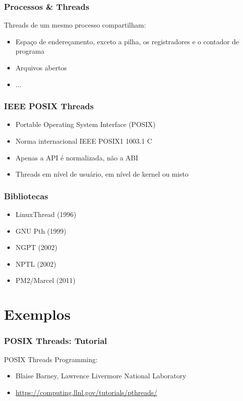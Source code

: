 \documentclass[10pt, compress]{beamer}
\begin{document}
\begin{frame}
    \frametitle{Processos \& Threads}
    \alert{Threads} de um mesmo processo \alert{compartilham}:

    \begin{itemize}
        \item \alert{Espaço de endereçamento}, exceto a pilha, os
            registradores e o contador de programa
        \item Arquivos abertos
        \item $\dots$
    \end{itemize}
\end{frame}

\begin{frame}
    \frametitle{IEEE POSIX Threads}
    \begin{itemize}
        \item Portable Operating System Interface (\alert{POSIX})
        \item Norma internacional IEEE POSIX1 1003.1 C
        \item Apenas a API é normalizada, não a ABI
        \item Threads em nível de usuário, em nível de kernel ou misto
    \end{itemize}
\end{frame}

\begin{frame}
    \frametitle{Bibliotecas}
    \begin{itemize}
        \item LinuxThread (1996)
        \item GNU Pth (1999)
        \item NGPT (2002)
        \item NPTL (2002)
        \item PM2/Marcel (2011)
    \end{itemize}
\end{frame}

\section{Exemplos}

\begin{frame}
    \frametitle{POSIX Threads: Tutorial}
    \alert{POSIX Threads Programming}:
    \begin{itemize}
        \item Blaise Barney, Lawrence Livermore National Laboratory
        \item \url{https://computing.llnl.gov/tutorials/pthreads/}
    \end{itemize}
\end{frame}
\end{document}
